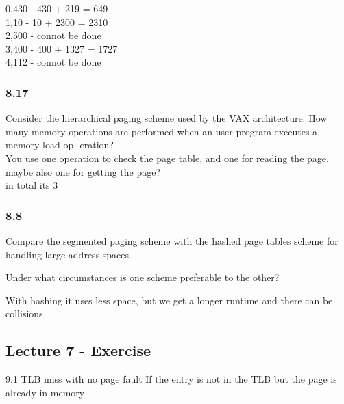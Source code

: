 \documentclass[a4paper,10pt,titlepage]{report}
\begin{document}
\hspace{10mm}    0,430 - 430 + 219 = 649 \\
\hspace{10mm}    1,10 -  10 + 2300 = 2310\\
\hspace{10mm}    2,500 - connot be done \\
\hspace{10mm}    3,400 - 400 + 1327 = 1727\\
\hspace{10mm}    4,112 - connot be done \\
\subsubsection{8.17}
Consider the hierarchical paging scheme used by the VAX architecture. How many memory operations are performed when an user program executes a memory load op- eration?\\
\hspace{10mm} You use one operation to check the page table, and one for reading the page. \\
\hspace{15mm} maybe also one for getting the page? \\ 
\hspace{15mm} in total its 3\\

\subsubsection{8.8}
Compare the segmented paging scheme with the hashed page tables scheme for handling large address spaces. \\
\begin{flushleft}
Under what circumstances is one scheme preferable to the other?\\
\end{flushleft}
\hspace{10mm} With hashing it uses less space, but we get a longer runtime and there can be collisions \\

\newpage
\subsection{Lecture 7 - Exercise}

9.1
TLB miss with no page fault
	If the entry is not in the TLB but the page is already in memory
\end{document}

